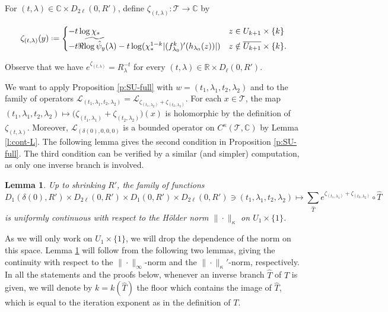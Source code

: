\documentclass[11pt]{amsart}
\theoremstyle{plain}
\newtheorem{lem}[thm]{Lemma}
\theoremstyle{definition}
\theoremstyle{remark}
\newcommand*{\defeq}{\mathrel{\vcenter{\baselineskip0.5ex \lineskiplimit0pt
			\hbox{\scriptsize.}\hbox{\scriptsize.}}}%
	=}
\begin{document}
\medskip

For $(t,\lambda) 
\in
\mathbb{C} 
\times  D_{2\ell}(0,R')$,
define $\zeta_{(t,\lambda)}\colon
\mathcal T \to \mathbb C$ by

$$\zeta_{(t,\lambda)}(y)
\defeq
\begin{cases}
-t\log\chi_* &
z \in U_{k+1}\times\{k\}\\
-t\Re \widetilde{\log \hat \psi_y}(\lambda) 
-t\log(\chi_*^{1-k}|(f^k_{\lambda_0})' (h_{\lambda_0}(z))|)
& z \notin \overline{U_{k+1}}\times\{k\}.
\end{cases}$$

Observe
that we have
$e^{\zeta_{(t,\lambda)}}=
R_\lambda^{-t}$ 
for
every
$(t,\lambda) \in \mathbb{R} \times D_\ell (0,R')$.

\medskip

We want to apply Proposition \ref{p:SU-full} 
with $w=(t_1,\lambda_1, t_2, \lambda_2)$
and to
the family of operators 
$\mathcal L_{(t_1,\lambda_1, t_2, \lambda_2)} 
= \mathcal L_{\zeta_{(t_1,\lambda_2)}+
\zeta_{(t_2, \lambda_2)}}$.
For each $x \in \mathcal{T}$, the map $(t_1,\lambda_1, t_2, \lambda_2)
\mapsto \big(
\zeta_{(t_1,\lambda_1)}
+
\zeta_{(t_2,\lambda_2)}\big) (x)$ is holomorphic by the definition of $\zeta_{(t,\lambda)}$.
Moreover, $\mathcal{L}_{(\delta(0),0,0,0)}$ is a bounded operator on $C^\kappa(\mathcal{T},\mathbb{C})$ by Lemma \ref{l:cont-L}. 
The following lemma gives the second condition in Proposition \ref{p:SU-full}. The third condition can be verified by
a
similar 
(and simpler) computation, as only one inverse branch is involved.


\begin{lem} \label{lem_314}
Up to shrinking $R'$, the family of functions
\[D_1(\delta(0),R')
\times  D_{2\ell}(0,R')
\times
D_1(0,R')
\times  D_{2\ell}(0,R')\ni (t_1,\lambda_1,t_2,\lambda_2) \mapsto 
\sum_{\hat T}
e^{\zeta_{(t_1,\lambda_1)}+
\zeta_{(t_2, \lambda_2)}} \circ \hat{T}\]
is uniformly continuous with respect to the 
H\"older norm $\|\cdot\|_{\kappa}$ on
$U_1 \times \{1\}$.
\end{lem}


As we will only work on
$U_1 \times \{1\}$,
we will drop the dependence of the norm on this space.
Lemma \ref{lem_314} 
will follow from the following
two 
lemmas,
giving 
the continuity with respect to the  $\|\cdot\|_\infty$-norm and the $\|\cdot\|_\kappa'$-norm, respectively.
In all the statements and the proofs 
below, whenever an inverse branch $\hat T$
of $T$ is given, we will denote by $k=k(\hat T)$
the floor which contains the
image of $\hat T$,
which is equal to the 
 iteration exponent
as in the definition of $T$.
\end{document}
